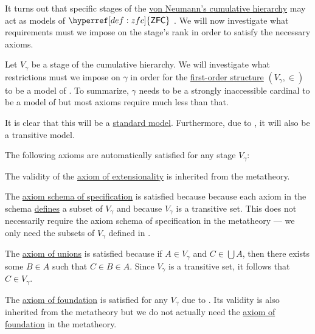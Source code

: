 \begin{remark}\label{thm:cumulative_hierarchy_model_of_zfc}
  It turns out that specific stages of the \hyperref[def:cumulative_hierarchy]{von Neumann's cumulative hierarchy} may act as models of \( \hyperref[def:zfc]{\logic{ZFC}} \) \). We will now investigate what requirements must we impose on the stage's rank in order to satisfy the necessary axioms.

  Let \( V_\gamma \) be a stage of the cumulative hierarchy. We will investigate what restrictions must we impose on \( \gamma \) in order for the \hyperref[def:first_order_structure]{first-order structure} \( (V_\gamma, \in) \) to be a model of . To summarize, \( \gamma \) needs to be a strongly inaccessible cardinal to be a model of  but most axioms require much less than that.

  It is clear that this will be a \hyperref[rem:standard_model_of_set_theory]{standard model}. Furthermore, due to , it will also be a transitive model.

  The following axioms are automatically satisfied for any stage \( V_\gamma \):
  \begin{thmenum}[series=thm:cumulative_hierarchy_model_of_zfc]
     The validity of the \hyperref[def:zfc/extensionality]{axiom of extensionality} is inherited from the metatheory.

     The \hyperref[def:zfc/specification]{axiom schema of specification} is satisfied because because each axiom in the schema \hyperref[def:first_order_definability]{defines} a subset of \( V_\gamma \) and because \( V_\gamma \) is a transitive set. This does not necessarily require the axiom schema of specification in the metatheory --- we only need the subsets of \( V_\gamma \) defined in .

     The \hyperref[def:zfc/union]{axiom of unions} is satisfied because if \( A \in V_\gamma \) and \( C \in \bigcup A \), then there exists some \( B \in A \) such that \( C \in B \in A \). Since \( V_\gamma \) is a transitive set, it follows that \( C \in V_\gamma \).

     The \hyperref[def:zfc/foundation]{axiom of foundation} is satisfied for any \( V_\gamma \) due to . Its validity is also inherited from the metatheory but we do not actually need the \hyperref[def:zfc/foundation]{axiom of foundation} in the metatheory.


\end{thmenum}
\end{remark}

